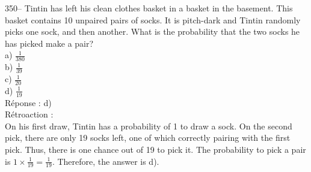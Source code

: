 \documentclass[letterpaper, 12pt]{article}
\begin{document}
350-- Tintin has left his clean clothes basket in a basket in the basement. This basket contains 10 unpaired pairs of socks.
It is pitch-dark and Tintin randomly picks one sock, and then another. What is the probability that the two socks he has picked make a pair?\\

a) $\frac{1}{380}$\\[2mm]
b) $\frac{1}{39}$\\[2mm]
c) $\frac{1}{20}$\\[2mm]
d) $\frac{1}{19}$\\

R\'eponse : d)\\

R\'etroaction : \\
On his first draw, Tintin has a probability of 1 to draw a sock. On the second pick, there are only 19 socks left, one of which correctly pairing with the first pick. Thus, there is one chance out of 19 to pick it. The probability to pick a pair is $1\times\frac{1}{19}=\frac{1}{19}$. Therefore, the answer is d).\\
\end{document}
